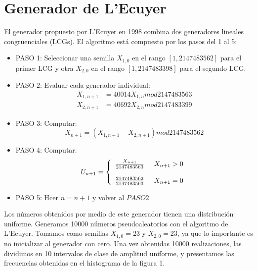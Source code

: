 \documentclass[10pt,journal,compsoc]{IEEEtran}
\begin{document}
\section{Generador de L'Ecuyer}
El generador propuesto por L'Ecuyer en 1998 combina dos generadores lineales congruenciales (LCGs).
El algoritmo est\'a compuesto por los pasos del 1 al 5:
\begin{itemize}
 \item{PASO 1:} Seleccionar una semilla $X_{1,0}$ en el rango $[1,2147483562]$ para el primer LCG y otra $X_{2,0}$ en el rango $[1,2147483398]$ para el segundo LCG.\\
 \item{PASO 2:} Evaluar cada generador individual:
 \begin{align*}
  X_{1,n+1} &= 40014 X_{1,n} mod 2147483563\\
  X_{2,n+1} &= 40692 X_{2,n} mod 2147483399
 \end{align*}
 
 \item{PASO 3:} Computar:
 \begin{equation*}
  X_{n+1} = (X_{1,n+1} - X_{2,n+1}) mod 2147483562
 \end{equation*}
 
 \item{PASO 4:} Computar:
  \begin{equation*}
  \label{eq:f(t)}
  U_{n+1} = \left\{
  \begin{array}{rl}
	\frac{X_{n+1}}{2147483563} \hspace{0.5cm} X_{n+1} > 0\\\\
	\frac{2147483562}{2147483563} \hspace{0.5cm} X_{n+1} = 0\\
  \end{array} \right.
  \end{equation*}

 \item{PASO 5:} Hcer $n = n + 1$ y volver al $PASO 2$
\end{itemize}

Los n\'umeros obtenidos por medio de este generador tienen una distribuci\'on uniforme.
Generamos 10000 n\'umeros pseudoaleatorios con el algoritmo de L'Ecuyer.  Tomamos como semillas $X_{1,0}=23$ y $X_{2,0}=23$, ya que lo importante
es no inicializar al generador con cero.  Una vez obtenidas 10000 realizaciones, las dividimos en 10 intervalos de clase de amplitud uniforme, y 
presentamos las frecuencias obtenidas en el histograma de la figura 1.
\end{document}
